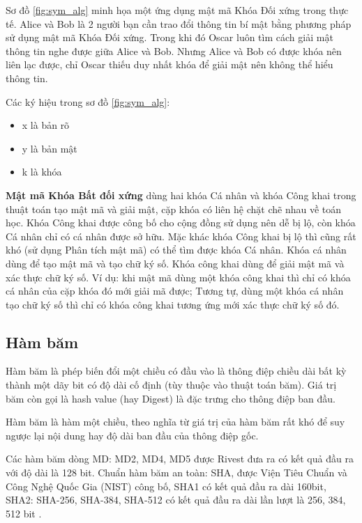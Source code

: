 Sơ đồ \ref{fig:sym_alg} minh họa một ứng dụng mật mã Khóa Đối xứng trong thực tế\cite{10.5555/1721909}. Alice và Bob là 2 người bạn cần trao đổi thông tin bí mật bằng phương pháp sử dụng mật mã Khóa Đối xứng. Trong khi đó Oscar luôn tìm cách giải mật thông tin nghe được giữa Alice và Bob. Nhưng Alice và Bob có được khóa nên liên lạc được, chỉ Oscar thiếu duy nhất khóa để giải mật nên không thể hiểu thông tin.

Các ký hiệu trong sơ đồ \ref{fig:sym_alg}:
\begin{itemize}
\item x là bản rõ
\item y là bản mật
\item k là khóa 
\end{itemize}

\textbf{Mật mã Khóa Bất đối xứng} dùng hai khóa Cá nhân và khóa Công khai trong thuật toán tạo mật mã và giải mật, cặp khóa có liên hệ chặt chẽ nhau về toán học. Khóa Công khai được công bố cho cộng đồng sử dụng nên dễ bị lộ, còn khóa Cá nhân chỉ có cá nhân được sở hữu. Mặc khác khóa Công khai bị lộ thì cũng rất khó (sử dụng Phân tích mật mã) có thể tìm được khóa Cá nhân.
Khóa cá nhân dùng để tạo mật mã và tạo chữ ký số. Khóa công khai dùng để giải mật mã và xác thực chữ ký số. Ví dụ: khi mật mã dùng một khóa công khai thì chỉ có khóa cá nhân của cặp khóa đó mới giải mã được; Tương tự, dùng một khóa cá nhân tạo chữ ký số thì chỉ có khóa công khai tương ứng mới xác thực chữ ký số đó.

\subsection{Hàm băm}

Hàm băm là phép biến đổi một chiều có đầu vào là thông điệp chiều dài bất kỳ thành một dãy bit có độ dài cố định (tùy thuộc vào thuật toán băm). Giá trị băm còn gọi là hash value (hay Digest) là đặc trưng cho thông điệp ban đầu.

Hàm băm là hàm một chiều, theo nghĩa từ giá trị của hàm băm rất khó để suy ngược lại nội dung hay độ dài ban đầu của thông điệp gốc.

Các hàm băm dòng MD: MD2, MD4, MD5 được Rivest đưa ra có kết quả đầu ra với độ dài là 128 bit. Chuẩn hàm băm an toàn: SHA, được Viện Tiêu Chuẩn và Công Nghệ Quốc Gia (NIST) công bố, SHA1 có kết quả đầu ra dài 160bit, SHA2: SHA-256, SHA-384, SHA-512 có kết quả đầu ra dài lần lượt là 256, 384, 512 bit \cite{10.5555/1721909}.

